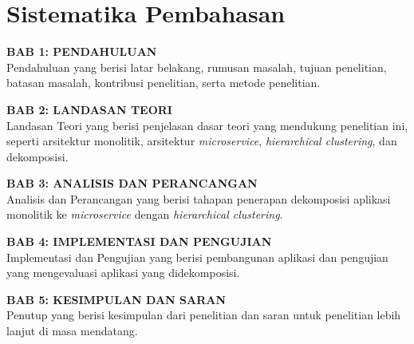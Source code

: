 \section{Sistematika Pembahasan}

\textbf{BAB 1: PENDAHULUAN} \\
Pendahuluan yang berisi latar belakang, rumusan masalah, tujuan penelitian, batasan masalah, kontribusi penelitian, serta metode penelitian.

\textbf{BAB 2: LANDASAN TEORI}\\
Landasan Teori yang berisi penjelasan dasar teori yang mendukung penelitian ini, seperti arsitektur monolitik, arsitektur \textit{microservice}, \textit{hierarchical clustering}, dan dekomposisi.

\textbf{BAB 3: ANALISIS DAN PERANCANGAN}\\
Analisis dan Perancangan yang berisi tahapan penerapan dekomposisi aplikasi monolitik ke \textit{microservice} dengan \textit{hierarchical clustering}.

\textbf{BAB 4: IMPLEMENTASI DAN PENGUJIAN}\\
Implementasi dan Pengujian yang berisi pembangunan aplikasi dan pengujian yang mengevaluasi aplikasi yang didekomposisi.

\textbf{BAB 5: KESIMPULAN DAN SARAN}\\
Penutup yang berisi kesimpulan dari penelitian dan saran untuk penelitian lebih lanjut di masa mendatang.